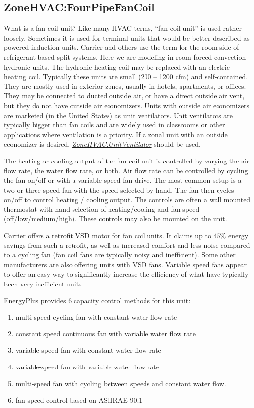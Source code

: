 \subsection{ZoneHVAC:FourPipeFanCoil}\label{zonehvacfourpipefancoil}

What is a fan coil unit? Like many HVAC terms, ``fan coil unit'' is used rather loosely. Sometimes it is used for terminal units that would be better described as powered induction units. Carrier and others use the term for the room side of refrigerant-based split systems. Here we are modeling in-room forced-convection hydronic units. The hydronic heating coil may be replaced with an electric heating coil. Typically these units are small (200 -- 1200 cfm) and self-contained. They are mostly used in exterior zones, usually in hotels, apartments, or offices. They may be connected to ducted outside air, or have a direct outside air vent, but they do not have outside air economizers. Units with outside air economizers are marketed (in the United States) as unit ventilators. Unit ventilators are typically bigger than fan coils and are widely used in classrooms or other applications where ventilation is a priority. If a zonal unit with an outside economizer is desired, \emph{\hyperref[zonehvacunitventilator]{ZoneHVAC:UnitVentilator}} should be used.

The heating or cooling output of the fan coil unit is controlled by varying the air flow rate, the water flow rate, or both. Air flow rate can be controlled by cycling the fan on/off or with a variable speed fan drive. The most common setup is a two or three speed fan with the speed selected by hand. The fan then cycles on/off to control heating / cooling output. The controls are often a wall mounted thermostat with hand selection of heating/cooling and fan speed (off/low/medium/high). These controls may also be mounted on the unit.

Carrier offers a retrofit VSD motor for fan coil units. It claims up to 45\% energy savings from such a retrofit, as well as increased comfort and less noise compared to a cycling fan (fan coil fans are typically noisy and inefficient). Some other manufacturers are also offering units with VSD fans. Variable speed fans appear to offer an easy way to significantly increase the efficiency of what have typically been very inefficient units.

EnergyPlus provides 6 capacity control methods for this unit:

\begin{enumerate}
\def\labelenumi{\arabic{enumi}.}
\item
  multi-speed cycling fan with constant water flow rate
\item
  constant speed continuous fan with variable water flow rate
\item
  variable-speed fan with constant water flow rate
\item
  variable-speed fan with variable water flow rate
\item
  multi-speed fan with cycling between speeds and constant water flow.
\item
  fan speed control based on ASHRAE 90.1
\end{enumerate}

